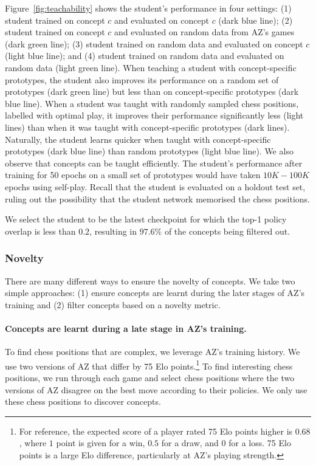 \documentclass{article}
\begin{document}
Figure~\ref{fig:teachability} shows the student's performance in four settings: 
(1) student trained on concept $c$ and evaluated on concept $c$ (dark blue line);
(2) student trained on concept $c$ and evaluated on random data from AZ's games (dark green line);
(3) student trained on random data and evaluated on concept $c$ (light blue line);
and (4) student trained on random data and evaluated on random data (light green line).
When teaching a student with concept-specific prototypes, the student also improves its performance on a random set of prototypes (dark green line) but less than on concept-specific prototypes (dark blue line). When a student was taught with randomly sampled chess positions, labelled with optimal play, it improves their performance significantly less (light lines) than when it was taught with concept-specific prototypes (dark lines). Naturally, the student learns quicker when taught with concept-specific prototypes (dark blue line) than random prototypes (light blue line).
We also observe that concepts can be taught efficiently. The student's performance after training for 50 epochs on a small set of prototypes would have taken $10K-100K$ epochs using self-play.
Recall that the student is evaluated on a holdout test set, ruling out the possibility that the student network memorised the chess positions. 

We select the student to be the latest checkpoint for which the top-1 policy overlap is less than $0.2$, resulting in $97.6 \%$ of the concepts being filtered out.

\subsubsection{Novelty \label{sec:novelty}}
There are many different ways to ensure the novelty of concepts. We take two simple approaches: (1) ensure concepts are learnt during the later stages of AZ's training and (2) filter concepts based on a novelty metric. 

\paragraph{Concepts are learnt during a late stage in AZ's training.}
To find chess positions that are complex, we leverage AZ's training history. We use two versions of AZ that differ by 75 Elo points.\footnote{For reference, the expected score of a player rated 75 Elo points higher is $0.68$, where $1$ point is given for a win, $0.5$ for a draw, and $0$ for a loss. 75 Elo points is a large Elo difference, particularly at AZ's playing strength.}
To find interesting chess positions, we run through each game and select chess positions where the two versions of AZ disagree on the best move according to their policies. We only use these chess positions to discover concepts. 
\end{document}
